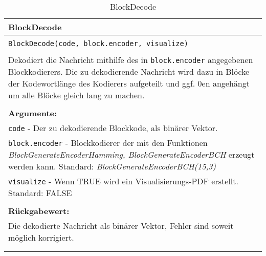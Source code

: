\begin{longtable}{|p{\textwidth}|}
\hline
\rowcolor{lightblue}BlockDecode\\
\hline
\\
\texttt{BlockDecode(code, block.encoder, visualize)}\\
\\
Dekodiert die Nachricht mithilfe des in \texttt{block.encoder} angegebenen Blockkodierers. Die zu dekodierende Nachricht wird dazu in Blöcke der Kodewortlänge des Kodierers aufgeteilt und ggf. 0en angehängt um alle Blöcke gleich lang zu machen. \\
\\
\textbf{Argumente:}\\
\texttt{code} - Der zu dekodierende Blockkode, als binärer Vektor.\\
\texttt{block.encoder} - Blockkodierer der mit den Funktionen \emph{BlockGenerateEncoderHamming, BlockGenerateEncoderBCH} erzeugt werden kann. Standard: \emph{BlockGenerateEncoderBCH(15,3)}\\
\texttt{visualize} - Wenn TRUE wird ein Visualisierungs-PDF erstellt. Standard: FALSE\\
\\
\textbf{Rückgabewert:}\\
Die dekodierte Nachricht als binärer Vektor, Fehler sind soweit möglich korrigiert.\\
\\
\hline
\caption{BlockDecode}
\end{longtable}